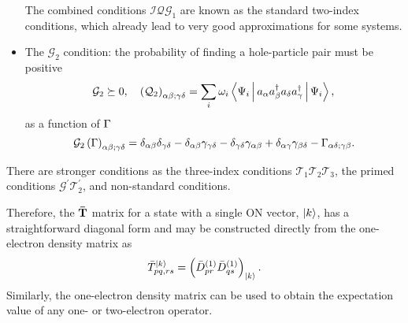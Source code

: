 \begin{itemize}
        The combined conditions $\mathcal{IQG}_1$ are known as the standard
        two-index conditions, which already lead to very good approximations
        for some systems.

    \item The $\mathcal{G}_2$ condition: the probability of finding a 
        hole-particle pair must be positive
        \begin{equation}
            \mathcal{G}_2 \succeq 0, \quad
            \left( \mathcal{Q}_2 \right)_{\alpha \beta;\gamma \delta} =
            \sum_{i} \omega_i 
            \Braket{\Psi_i | a_{\alpha} a_{\beta}^{\dagger} 
            a_{\delta} a_{\gamma}^{\dagger} | \Psi_i},
        \end{equation}
        as a function of $\sordm$
        \begin{equation}
            \mathcal{G}_2\left( \sordm \right)_{\alpha\beta;\gamma\delta} =
            \delta_{\alpha \beta } \delta_{\gamma \delta} - 
            \delta_{\alpha \beta } \fordm_{\gamma \delta} - 
            \delta_{\gamma \delta } \fordm_{\alpha \beta} +
            \delta_{\alpha \gamma } \fordm_{\beta \delta} -
            \sordm_{\alpha \delta ; \gamma \beta}
            .
        \end{equation}
\end{itemize}

There are stronger conditions as the three-index conditions $\mathcal{T}_1 \mathcal{T}_2 \mathcal{T}_3$,
the primed conditions
$\mathcal{G^{\prime}} \mathcal{T}_2^{\prime}$, and non-standard conditions.

Therefore, the $ \mat{\bar{T}}$ matrix for a state with a single ON vector, $\Ket{k}$, has a 
straightforward diagonal form and may be constructed directly from the one-electron
density matrix as
\begin{equation} \label{eq:T_from_D1s}
    \bar{T}_{pq,rs}^{\Ket{k}} = \left( \oedmso_{pr}  \oedmso_{qs} \right)_{\Ket{k}}
    .
\end{equation}
Similarly, the one-electron density matrix can be used to obtain the 
expectation value of any one- or two-electron operator.

